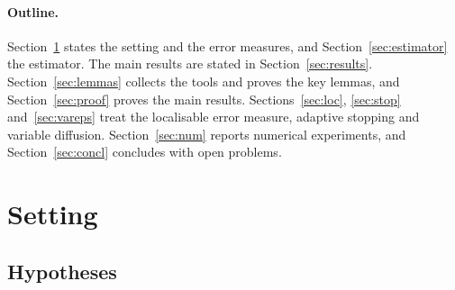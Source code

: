 \documentclass[11pt]{article}
\theoremstyle{plain}
\theoremstyle{remark}
\numberwithin{equation}{section}
\begin{document}
\paragraph{Outline.} Section~\ref{sec:setting} states the setting and the error measures, and
Section~\ref{sec:estimator} the estimator. The main results are stated in Section~\ref{sec:results}.
Section~\ref{sec:lemmas} collects the tools and proves the key lemmas, and Section~\ref{sec:proof}
proves the main results. Sections~\ref{sec:loc}, \ref{sec:stop} and~\ref{sec:vareps} treat the
localisable error measure, adaptive stopping and variable diffusion. Section~\ref{sec:num} reports
numerical experiments, and Section~\ref{sec:concl} concludes with open problems.

\section{Setting}\label{sec:setting}

\subsection{Hypotheses}
\end{document}
